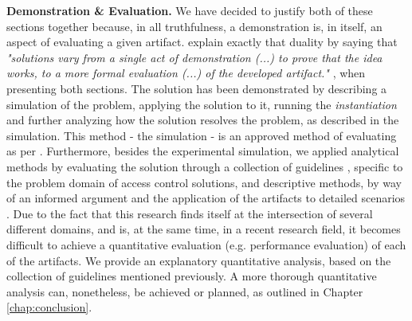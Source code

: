 \textbf{Demonstration \& Evaluation.} We have decided to justify both of these sections together because, in all truthfulness, a demonstration is, in itself, an aspect of evaluating a given artifact. \citeauthor{peffers_design_2007} \cite{peffers_design_2007} explain exactly that duality by saying that \textit{"solutions vary from a single act of demonstration (...) to prove that the idea works, to a more formal evaluation (...) of the developed artifact."} \cite[13]{peffers_design_2007}, when presenting both sections. The solution has been demonstrated by describing a simulation of the problem, applying the solution to it, running the \textit{instantiation} and further analyzing how the solution resolves the problem, as described in the simulation. This method - the simulation - is an approved method of evaluating as per \citeauthor{hevner_design_2004} \cite[13]{hevner_design_2004}. Furthermore, besides the experimental simulation, we applied analytical methods by evaluating the solution through a collection of guidelines \cite{hu_guidelines_2012}, specific to the problem domain of access control solutions, and descriptive methods, by way of an informed argument and the application of the artifacts to detailed scenarios \cite[86]{peffers_design_2007}. Due to the fact that this research finds itself at the intersection of several different domains, and is, at the same time, in a recent research field, it becomes difficult to achieve a quantitative evaluation (e.g. performance evaluation) of each of the artifacts. We provide an explanatory quantitative analysis, based on the collection of guidelines mentioned previously. A more thorough quantitative analysis can, nonetheless, be achieved or planned, as outlined in Chapter \ref{chap:conclusion}.

